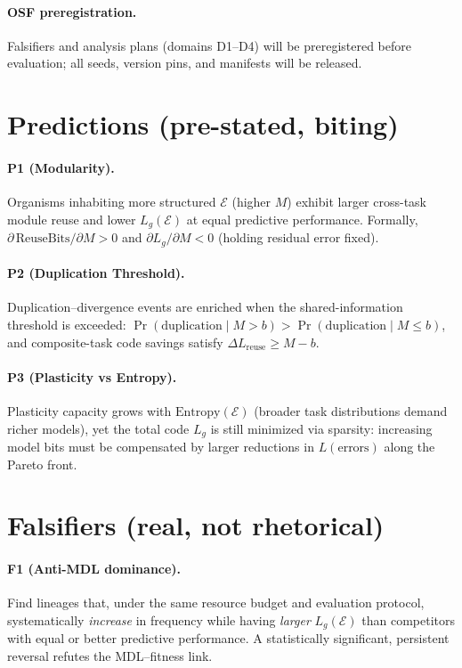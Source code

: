 \documentclass[11pt,a4paper]{article}
\begin{document}
\paragraph{OSF preregistration.} Falsifiers and analysis plans (domains D1--D4) will be preregistered before evaluation; all seeds, version pins, and manifests will be released.


\section{Predictions (pre-stated, biting)}

\paragraph{P1 (Modularity).}
Organisms inhabiting more structured $\mathcal{E}$ (higher $M$) exhibit larger cross-task module reuse and lower $L_g(\mathcal{E})$ at equal predictive performance. Formally, $\partial\,\text{ReuseBits}/\partial M>0$ and $\partial L_g/\partial M<0$ (holding residual error fixed).

\paragraph{P2 (Duplication Threshold).}
Duplication–divergence events are enriched when the shared-information threshold is exceeded: $\Pr(\text{duplication}\mid M>b)>\Pr(\text{duplication}\mid M\le b)$, and composite-task code savings satisfy $\Delta L_{\text{reuse}}\ge M-b$.

\paragraph{P3 (Plasticity vs Entropy).}
Plasticity capacity grows with $\mathrm{Entropy}(\mathcal{E})$ (broader task distributions demand richer models), yet the total code $L_g$ is still minimized via sparsity: increasing model bits must be compensated by larger reductions in $L(\text{errors})$ along the Pareto front.


\section{Falsifiers (real, not rhetorical)}

\paragraph{F1 (Anti-MDL dominance).}
Find lineages that, under the same resource budget and evaluation protocol, systematically \emph{increase} in frequency while having \emph{larger} $L_g(\mathcal{E})$ than competitors with equal or better predictive performance. A statistically significant, persistent reversal refutes the MDL–fitness link.
\end{document}
